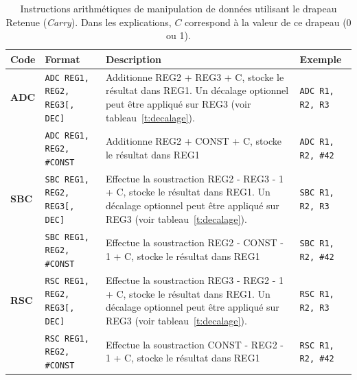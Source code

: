 \documentclass{tufte-handout}
\begin{document}
\begin{table}
\begin{tabular}{l|l|p{7.5cm}l}
Code & Format & Description & Exemple \\ \hline

\textbf{ADC} & \texttt{ADC REG1, REG2, REG3[, DEC]} 	& Additionne REG2 + REG3 + C, stocke le résultat dans REG1. Un décalage optionnel peut être appliqué sur REG3 (voir tableau~\ref{t:decalage}). & \texttt{ADC R1, R2, R3} \\
 			 & \texttt{ADC REG1, REG2, \#CONST} 			& Additionne REG2 + CONST + C, stocke le résultat dans REG1 & \texttt{ADC R1, R2, \#42} \\
\hline
\textbf{SBC} & \texttt{SBC REG1, REG2, REG3[, DEC]} 	& Effectue la soustraction REG2 - REG3 - 1 + C, stocke le résultat dans REG1. Un décalage optionnel peut être appliqué sur REG3 (voir tableau~\ref{t:decalage}). & \texttt{SBC R1, R2, R3} \\
 			 & \texttt{SBC REG1, REG2, \#CONST} 			& Effectue la soustraction REG2 - CONST - 1 + C, stocke le résultat dans REG1 & \texttt{SBC R1, R2, \#42} \\
\hline
\textbf{RSC} & \texttt{RSC REG1, REG2, REG3[, DEC]} 	& Effectue la soustraction REG3 - REG2 - 1 + C, stocke le résultat dans REG1. Un décalage optionnel peut être appliqué sur REG3 (voir tableau~\ref{t:decalage}). & \texttt{RSC R1, R2, R3} \\
 			 & \texttt{RSC REG1, REG2, \#CONST} 			& Effectue la soustraction CONST - REG2 - 1 + C, stocke le résultat dans REG1 & \texttt{RSC R1, R2, \#42} \\
\hline

\end{tabular}
\label{t:dataarithwithcarry}
\caption{Instructions arithmétiques de manipulation de données utilisant le drapeau Retenue (\textit{Carry}). Dans les explications, $C$ correspond à la valeur de ce drapeau (0 ou 1).}
\end{table}
\end{document}
